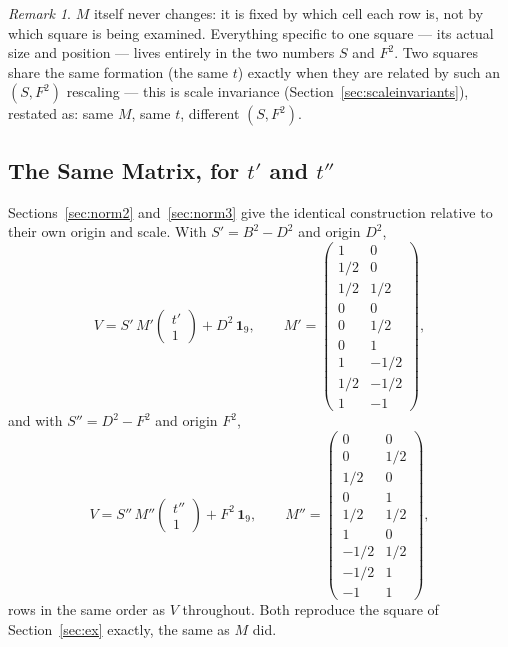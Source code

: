 \documentclass[12pt]{article}
\theoremstyle{remark}
\newtheorem{remark}[theorem]{Remark}
\begin{document}
\begin{remark}
$M$ itself never changes: it is fixed by which cell each row is, not
by which square is being examined. Everything specific to one square
--- its actual size and position --- lives entirely in the two
numbers $S$ and $F^2$. Two squares share the same formation (the same
$t$) exactly when they are related by such an $(S,F^2)$ rescaling ---
this is scale invariance (Section~\ref{sec:scaleinvariants}), restated
as: same $M$, same $t$, different $(S,F^2)$.
\end{remark}

\subsection{The Same Matrix, for $t'$ and $t''$}

Sections~\ref{sec:norm2} and~\ref{sec:norm3} give the identical
construction relative to their own origin and scale. With
$S' = B^2 - D^2$ and origin $D^2$,
\[
V = S'\,M' \begin{pmatrix} t' \\ 1 \end{pmatrix} + D^2\,\mathbf{1}_9 ,
\qquad
M' =
\begin{pmatrix}
1 & 0 \\ 1/2 & 0 \\ 1/2 & 1/2 \\ 0 & 0 \\ 0 & 1/2 \\ 0 & 1 \\
1 & -1/2 \\ 1/2 & -1/2 \\ 1 & -1
\end{pmatrix} ,
\]
and with $S'' = D^2 - F^2$ and origin $F^2$,
\[
V = S''\,M'' \begin{pmatrix} t'' \\ 1 \end{pmatrix} + F^2\,\mathbf{1}_9 ,
\qquad
M'' =
\begin{pmatrix}
0 & 0 \\ 0 & 1/2 \\ 1/2 & 0 \\ 0 & 1 \\ 1/2 & 1/2 \\ 1 & 0 \\
-1/2 & 1/2 \\ -1/2 & 1 \\ -1 & 1
\end{pmatrix} ,
\]
rows in the same order as $V$ throughout. Both reproduce the square of
Section~\ref{sec:ex} exactly, the same as $M$ did.
\end{document}
